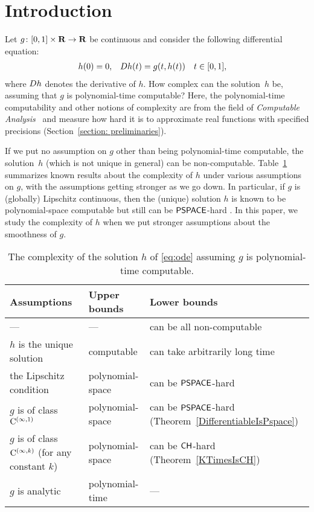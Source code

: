 \section{Introduction}

Let $g \colon [0,1] \times \mathbf R \to \mathbf R$ be continuous 
and consider the following differential equation: 
\begin{align}
 \label{eq:ode}
 h(0) & = 0, &
 D h(t) & = g(t,h(t)) \quad t \in [0,1], 
\end{align}
where $D h$ denotes the derivative of $h$. 
How complex can the solution~$h$ be, 
assuming that $g$ is polynomial-time computable? 
Here, the polynomial-time computability 
and other notions of complexity 
are from the field of 
\emph{Computable Analysis}~\cite{weihrauch00:_comput_analy}
and measure how hard it is to 
approximate real functions with specified precisions 
(Section~\ref{section: preliminaries}). 

If we put no assumption on $g$ other than being polynomial-time computable, 
the solution~$h$ (which is not unique in general) can be non-computable. 
Table~\ref{table:related} summarizes known results about 
the complexity of $h$ under various assumptions on $g$, 
with the assumptions getting stronger as we go down. 
In particular, if $g$ is (globally) Lipschitz continuous, 
then the (unique) solution $h$ is known to be 
polynomial-space computable but still can be 
$\mathsf{PSPACE}$-hard \cite{kawamura2010lipschitz}. 
In this paper, we study the complexity of $h$ 
when we put stronger assumptions about 
the smoothness of $g$. 

\begin{table}
\renewcommand\arraystretch{1.3}
\begin{center}
 \caption{The complexity of the solution $h$ of \eqref{eq:ode}
 assuming $g$ is polynomial-time computable.}
 \label{table:related}
 \begin{tabular}{lll}
  Assumptions & Upper bounds & Lower bounds \\
  \hline
   --- & --- & can be all non-computable \cite{pour1979computable} \\
  $h$ is the unique solution & computable \cite{coddington1955theory}
  & can take arbitrarily long time \cite{ko1983computational,miller1970recursive} \\
  the Lipschitz condition  & polynomial-space \cite{ko1983computational}
      &	can be $\mathsf{PSPACE}$-hard \cite{kawamura2010lipschitz}\\
  $g$ is of class $\mathrm C ^{(\infty, 1)}$ & polynomial-space 
      & \parbox[t]{11em}{can be $\mathsf{PSPACE}$-hard\\{}(Theorem~\ref{DifferentiableIsPspace})} \\
  \parbox[t]{11em}{$g$ is of class $\mathrm C ^{(\infty, k)}$\\{}(for any constant $k$)}
  & polynomial-space & \parbox[t]{14zw}{can be $\mathsf{CH}$-hard\\{}(Theorem~\ref{KTimesIsCH})} \\
  $g$ is analytic
  & polynomial-time \cite{muller1987uniform,ko1988computing} 
  & ---
 \end{tabular}
\end{center}
\end{table}

